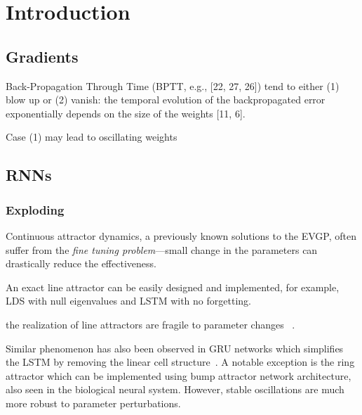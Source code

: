 \documentclass{article}
\theoremstyle{definition}
\theoremstyle{remark}
\begin{document}



\newpage 
\section{Introduction}





\subsection{Gradients}

Back-Propagation Through Time (BPTT, e.g., [22, 27, 26])  tend to either (1) blow up or (2) vanish:
 the temporal evolution of the backpropagated error exponentially depends on the size of the weights [11, 6]. 

Case (1) may lead to oscillating weights

\subsection{RNNs}

\citep{vogtLyapunovExponentsRNNs2022}

\citep{kolenGradientFlowRecurrent2009}




\subsubsection{Exploding}

Continuous attractor dynamics, a previously known solutions to the EVGP, often suffer from the \emph{fine tuning problem}---small change in the parameters can drastically reduce the effectiveness.

An exact line attractor can be easily designed and implemented, for example, LDS with null eigenvalues and LSTM with no forgetting.

 the realization of line attractors are fragile to parameter changes ~\citep{seung1998,goldman2003}.

Similar phenomenon has also been observed in GRU networks which simplifies the LSTM by removing the linear cell structure~\citep{jordan2021}.
A notable exception is the ring attractor which can be implemented using bump attractor network architecture, also seen in the biological neural system.
However, stable oscillations are much more robust to parameter perturbations.
\end{document}
